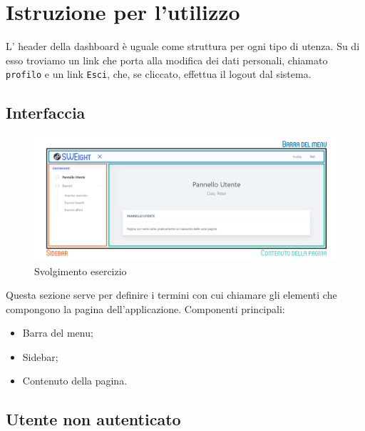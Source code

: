 \section{Istruzione per l'utilizzo}
  L' header della dashboard è uguale come struttura per ogni tipo di utenza. Su di esso troviamo un link che porta alla modifica dei dati personali, chiamato \texttt{profilo} e un link \texttt{Esci}, che, se cliccato, effettua il logout dal sistema.



\subsection{Interfaccia}
    \begin{figure}[H]
        \centering
        \includegraphics[width=17cm]{sez/img/istruzioni/dashboardMod.png} 
        \caption{Svolgimento esercizio}\label{fig:1}
    \end{figure}
  Questa sezione serve per definire i termini con cui chiamare gli elementi che compongono la pagina dell'applicazione.
    Componenti principali:
    \begin{itemize}
        \item Barra del menu;
        \item {Sidebar};
        \item Contenuto della pagina.
    \end{itemize}


\subsection{Utente non autenticato}
